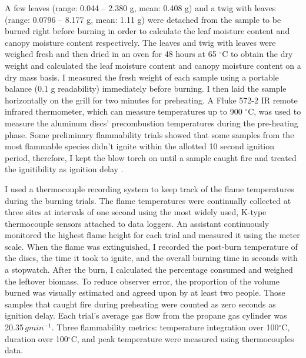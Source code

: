 \documentclass{ttuthes2007}
\begin{document}
A few leaves (range: 0.044 -- 2.380 g, mean: 0.408 g) and a twig with leaves (range: 0.0796 -- 8.177 g, mean: 1.11 g) were detached from the sample to be burned right before burning in order to calculate the leaf moisture content and canopy moisture content respectively. The leaves and twig with leaves were weighed fresh and then dried in an oven for 48 hours at 65 $^{\circ}$C to obtain the dry weight and calculated the leaf moisture content and canopy moisture content on a dry mass basis.
I measured the fresh weight of each sample using a portable balance (0.1 g readability) immediately before burning. %
I then laid the sample horizontally on the grill for two minutes for preheating. A Fluke 572-2 IR remote infrared thermometer, which can measure temperatures up to 900 $^{\circ}$C, was used to measure the aluminum discs' precombustion temperatures during the pre-heating phase. Some preliminary flammability trials %
showed that some samples from the most flammable species didn't ignite within the allotted 10 second ignition period, therefore, I kept the blow torch on until a sample caught fire and treated the ignitibility as ignition delay \citep{anderson1970forest}.  

I used a thermocouple recording system to keep track of the flame temperatures during the burning trials. The flame temperatures were continually collected at three sites at intervals of one second using the most widely used, K-type thermocouple sensors \citep{mcgranahan2020inconvenient} attached to data loggers. %
An assistant continuously monitored the highest flame height for each trial and measured it using the meter scale. When the flame was extinguished, I recorded the post-burn temperature of the discs, the time it took to ignite, and the overall burning time in seconds with a stopwatch. After the burn, I calculated the percentage consumed and weighed the leftover biomass. To reduce observer error, the proportion of the volume burned was visually estimated and agreed upon by at least two people. Those samples that caught fire during preheating were counted as zero seconds as ignition delay. Each trial's average gas flow from the propane gas cylinder was 20.35\,$g min^{-1}$. Three flammability metrics: temperature integration over 100$^{\circ}$C, duration over 100$^{\circ}$C, and peak temperature were measured using thermocouples data.
\end{document}
